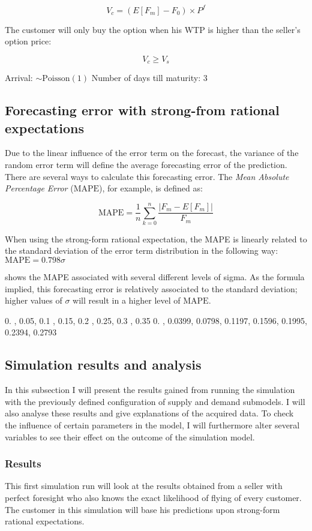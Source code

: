 $$ V_c = (E[F_m] - F_0) \times P^f $$

The customer will only buy the option when his WTP is higher than the seller's option price:

$$ V_c \ge V_s $$


Arrival: $ \sim \mbox{Poisson}(1) $
Number of days till maturity: 3


\subsection{Forecasting error with strong-from rational expectations}
Due to the linear influence of the error term on the forecast, the variance of the random error term will define the average forecasting error of the prediction. There are several ways to calculate this forecasting error. The \emph{Mean Absolute Percentage Error} ($\mbox{MAPE}$), for example, is defined as:

$$ \mbox{MAPE} = \frac{1}{n} \sum\limits_{k=0}^n \frac{|F_m - E[F_m]|}{F_m} $$

When using the strong-form rational expectation, the MAPE is linearly related to the standard deviation of the error term distribution in the following way: $ \mbox{MAPE} = 0.798 \sigma $

 shows the MAPE associated with several different levels of sigma. As the formula implied, this forecasting error is relatively associated to the standard deviation; higher values of $\sigma$ will result in a higher level of $\mbox{MAPE}$.

0.  ,  0.05,  0.1 ,  0.15,  0.2 ,  0.25,  0.3 ,  0.35
0.    ,  0.0399,  0.0798,  0.1197,  0.1596,  0.1995,  0.2394, 0.2793

\subsection{Simulation results and analysis}
In this subsection I will present the results gained from running the simulation with the previously defined configuration of supply and demand submodels. I will also analyse these results and give explanations of the acquired data. To check the influence of certain parameters in the model, I will furthermore alter several variables to see their effect on the outcome of the simulation model.

\subsubsection{Results}
This first simulation run will look at the results obtained from a seller with perfect foresight who also knows the exact likelihood of flying of every customer. The customer in this simulation will base his predictions upon strong-form rational expectations.

